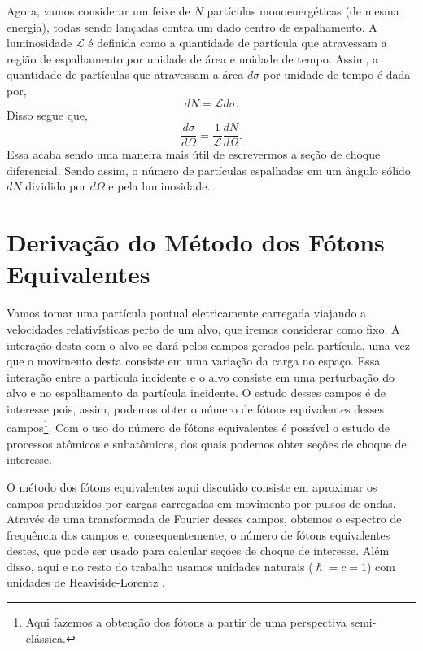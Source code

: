Agora, vamos considerar um feixe de $N$ partículas monoenergéticas (de mesma
energia), todas sendo lançadas contra um dado centro de espalhamento. A
luminosidade $\mathcal{L}$ é definida como a quantidade de partícula que
atravessam a região de espalhamento por unidade de área e unidade de tempo.
Assim, a quantidade de partículas que atravessam a área $d\sigma$ por unidade
de tempo é dada por,
\begin{equation}
	dN = \mathcal{L} d\sigma.
\end{equation}
Disso segue que,
\begin{equation}
	\frac{d\sigma}{d\Omega} = \frac{1}{\mathcal{L}} \frac{dN}{d\Omega}.
\end{equation}
Essa acaba sendo uma maneira mais útil de escrevermos a seção de choque
diferencial. Sendo assim, o número de partículas espalhadas em um ângulo sólido
$dN$ dividido por $d\Omega$ e pela luminosidade.


\section{Derivação do Método dos Fótons Equivalentes}
Vamos tomar uma partícula pontual eletricamente carregada viajando a
velocidades relativísticas perto de um alvo, que iremos considerar como fixo. A
interação desta com o alvo se dará pelos campos gerados pela partícula, uma vez
que o movimento desta consiste em uma variação da carga no espaço. Essa
interação entre a partícula incidente e o alvo consiste em uma perturbação do
alvo e no espalhamento da partícula incidente.  O estudo desses campos é de
interesse pois, assim, podemos obter o número de fótons equivalentes desses
campos\footnote{Aqui fazemos a obtenção dos fótons a partir de uma perspectiva
semi-clássica.}. Com o uso do número de fótons equivalentes é possível o estudo
de processos atômicos e subatômicos, dos quais podemos obter seções de choque
de interesse.

O método dos fótons equivalentes aqui discutido consiste em aproximar os campos
produzidos por cargas carregadas em movimento por pulsos de ondas.  Através de
uma transformada de Fourier desses campos, obtemos o espectro de frequência dos
campos e, consequentemente, o número de fótons equivalentes destes, que pode
ser usado para calcular seções de choque de interesse.  Além disso, aqui e no
resto do trabalho usamos unidades naturais ($\hslash = c = 1$) com unidades de
Heaviside-Lorentz \cite{jackson3} \cite{mariola} \cite{caruso_quanta}
\cite{nivaldo_cap6}.

